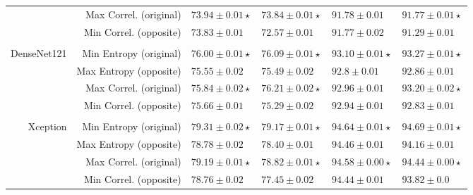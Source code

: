 \begin{table}[h]
\begin{tabularx}{\textwidth}{rr|YY|YY}
						   &  Max Correl. (original) & $\mathbf{73.94\pm0.01\star}$  & $\mathbf{73.84\pm0.01\star}$ & $\mathbf{91.78\pm0.01}$       & $\mathbf{91.77\pm0.01\star}$      \\
						   &  Min Correl. (opposite) & $73.83\pm0.01$                & $72.57\pm0.01	$              & $91.77\pm0.02$                     & $91.29\pm0.01$                    \\
						   &                         &                               &                              &                                    &                                   \\
			{ DenseNet121} & Min Entropy  (original) & $\mathbf{76.00\pm0.01\star}$  & $\mathbf{76.09\pm0.01\star}$ & $\mathbf{93.10\pm0.01\star}$       & $\mathbf{93.27\pm0.01\star}$      \\
						   & Max Entropy  (opposite) & $75.55\pm0.02$                & $75.49\pm0.02$               & $92.8\pm0.01$                      & $92.86\pm0.01$                    \\
						   &  Max Correl. (original) & $\mathbf{75.84\pm0.02\star}$  & $\mathbf{76.21\pm0.02\star}$ & $\mathbf{92.96\pm0.01}$       & $\mathbf{93.20\pm0.02\star}$      \\
						   & Min Correl.  (opposite) & $75.66\pm0.01$                & $75.29\pm0.02$               & $92.94\pm0.01$                     & $92.83\pm0.01$                    \\
						   &                         &                               &                              &                                    &                                   \\
			   { Xception} & Min Entropy  (original) & $\mathbf{79.31\pm0.02\star}$  & $\mathbf{79.17\pm0.01\star}$ & $\mathbf{94.64\pm0.01\star}$       & $\mathbf{94.69\pm0.01\star}$      \\
						   & Max Entropy  (opposite) & $78.78\pm0.02$                & $78.40\pm0.01$               & $94.46\pm0.01$                     & $94.16\pm0.01$                    \\
						   & Max Correl.  (original) & $\mathbf{79.19\pm0.01\star}$  & $\mathbf{78.82\pm0.01\star}$ & $\mathbf{94.58\pm0.00\star}$       & $\mathbf{94.44\pm0.00\star}$      \\
						   & Min Correl.  (opposite) & $78.76\pm0.02$                & $77.45\pm0.02$               & $94.44\pm0.01$                     & $93.82\pm0.0$                     \\ \bottomrule
	 \end{tabularx}
	 \label{tab:results2}
 \end{table}
 
